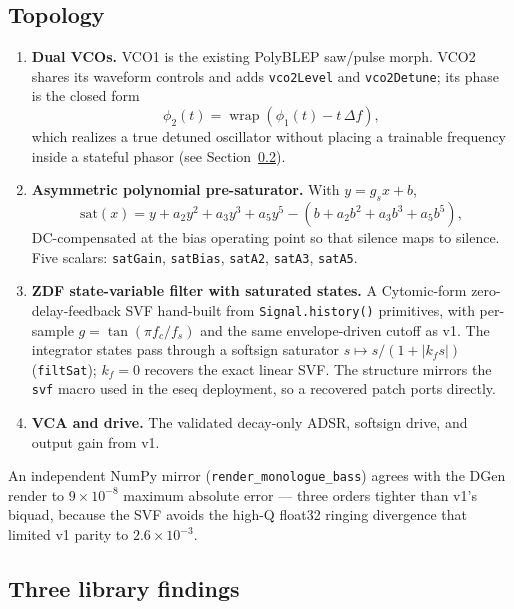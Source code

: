 \documentclass[10pt]{article}
\newcommand{\code}[1]{\texttt{#1}}
\begin{document}
\subsection{Topology}

\begin{enumerate}
  \item \textbf{Dual VCOs.} VCO1 is the existing PolyBLEP saw/pulse morph. VCO2 shares its waveform controls and adds \code{vco2Level} and \code{vco2Detune}; its phase is the closed form
  \begin{equation}
  \phi_2(t) = \operatorname{wrap}\!\left(\phi_1(t) - t\,\Delta f\right),
  \end{equation}
  which realizes a true detuned oscillator without placing a trainable frequency inside a stateful phasor (see Section~\ref{sec:bugs}).
  \item \textbf{Asymmetric polynomial pre-saturator.} With $y = g_s x + b$,
  \begin{equation}
  \mathrm{sat}(x) = y + a_2 y^2 + a_3 y^3 + a_5 y^5 - \left(b + a_2 b^2 + a_3 b^3 + a_5 b^5\right),
  \end{equation}
  DC-compensated at the bias operating point so that silence maps to silence. Five scalars: \code{satGain}, \code{satBias}, \code{satA2}, \code{satA3}, \code{satA5}.
  \item \textbf{ZDF state-variable filter with saturated states.} A Cytomic-form zero-delay-feedback SVF hand-built from \code{Signal.history()} primitives, with per-sample $g = \tan(\pi f_c / f_s)$ and the same envelope-driven cutoff as v1. The integrator states pass through a softsign saturator $s \mapsto s/(1+|k_f s|)$ (\code{filtSat}); $k_f = 0$ recovers the exact linear SVF. The structure mirrors the \code{svf} macro used in the eseq deployment, so a recovered patch ports directly.
  \item \textbf{VCA and drive.} The validated decay-only ADSR, softsign drive, and output gain from v1.
\end{enumerate}

An independent NumPy mirror (\code{render\_monologue\_bass}) agrees with the DGen render to $9\times10^{-8}$ maximum absolute error --- three orders tighter than v1's biquad, because the SVF avoids the high-Q float32 ringing divergence that limited v1 parity to $2.6\times10^{-3}$.

\subsection{Three library findings}
\label{sec:bugs}
\end{document}
